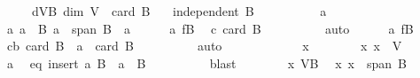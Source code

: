 \begin{isabellebody}
\ \ \ \ \ dVB{\isacharcolon}{\kern0pt}\ {\isachardoublequoteopen}dim\ V\ {\isasymge}\ card\ B{\isachardoublequoteclose}\isanewline
\ \ \ {\isachardoublequoteopen}independent\ B{\isachardoublequoteclose}\isanewline
%
\isadelimproof
%
\endisadelimproof
%
\isatagproof
{}\isamarkupfalse%
\ {\isacharminus}{\kern0pt}\isanewline
\ \ \isacommand{{\isacharbraceleft}{\kern0pt}}\isamarkupfalse%
\isanewline
\ \ \ \ \isamarkupfalse%
\ a\isanewline
\ \ \ \ \isamarkupfalse%
\ a{\isacharcolon}{\kern0pt}\ {\isachardoublequoteopen}a\ {\isasymin}\ B{\isachardoublequoteclose}\ {\isachardoublequoteopen}a\ {\isasymin}\ span\ {\isacharparenleft}{\kern0pt}B\ {\isacharminus}{\kern0pt}\ {\isacharbraceleft}{\kern0pt}a{\isacharbraceright}{\kern0pt}{\isacharparenright}{\kern0pt}{\isachardoublequoteclose}\isanewline
\ \ \ \ \isamarkupfalse%
\ a\ fB\ \isamarkupfalse%
\ c{}{\isacharcolon}{\kern0pt}\ {\isachardoublequoteopen}card\ B\ {\isasymnoteq}\ {}{\isachardoublequoteclose}\isanewline
\ \ \ \ \ \ \isamarkupfalse%
\ auto\isanewline
\ \ \ \ \isamarkupfalse%
\ a\ fB\ \isamarkupfalse%
\ cb{\isacharcolon}{\kern0pt}\ {\isachardoublequoteopen}card\ {\isacharparenleft}{\kern0pt}B\ {\isacharminus}{\kern0pt}\ {\isacharbraceleft}{\kern0pt}a{\isacharbraceright}{\kern0pt}{\isacharparenright}{\kern0pt}\ {\isacharequal}{\kern0pt}\ card\ B\ {\isacharminus}{\kern0pt}\ {}{\isachardoublequoteclose}\isanewline
\ \ \ \ \ \ \isamarkupfalse%
\ auto\isanewline
\ \ \ \ \isacommand{{\isacharbraceleft}{\kern0pt}}\isamarkupfalse%
\isanewline
\ \ \ \ \ \ \isamarkupfalse%
\ x\isanewline
\ \ \ \ \ \ \isamarkupfalse%
\ x{\isacharcolon}{\kern0pt}\ {\isachardoublequoteopen}x\ {\isasymin}\ V{\isachardoublequoteclose}\isanewline
\ \ \ \ \ \ \isamarkupfalse%
\ a\ \isamarkupfalse%
\ eq{\isacharcolon}{\kern0pt}\ {\isachardoublequoteopen}insert\ a\ {\isacharparenleft}{\kern0pt}B\ {\isacharminus}{\kern0pt}\ {\isacharbraceleft}{\kern0pt}a{\isacharbraceright}{\kern0pt}{\isacharparenright}{\kern0pt}\ {\isacharequal}{\kern0pt}\ B{\isachardoublequoteclose}\isanewline
\ \ \ \ \ \ \ \ \isamarkupfalse%
\ blast\isanewline
\ \ \ \ \ \ \isamarkupfalse%
\ x\ VB\ \isamarkupfalse%
\ x{\isacharprime}{\kern0pt}{\isacharcolon}{\kern0pt}\ {\isachardoublequoteopen}x\ {\isasymin}\ span\ B{\isachardoublequoteclose}\isanewline

\end{isabellebody}
